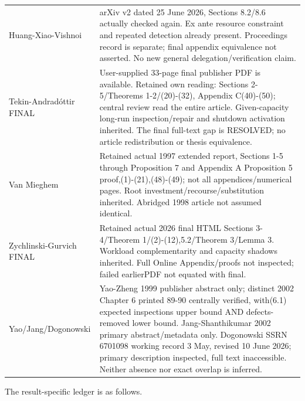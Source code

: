 \documentclass[
  11pt,
  a4paper,
]{article}
\begin{document}
\begin{longtable}[]{@{}
  >{\raggedright\arraybackslash}p{}
  >{\raggedright\arraybackslash}p{}@{}}
Huang-Xiao-Vishnoi & arXiv v2 dated 25 June 2026, Sections 8.2/8.6
actually checked again. Ex ante resource constraint and repeated
detection already present. Proceedings record is separate; final
appendix equivalence not asserted. No new general
delegation/verification claim. \\
Tekin-Andradóttir FINAL & User-supplied 33-page final publisher PDF is
available. Retained own reading: Sections 2-5/Theorems 1-2/(20)-(32),
Appendix C(40)-(50); central review read the entire article.
Given-capacity long-run inspection/repair and shutdown activation
inherited. The final full-text gap is RESOLVED; no article
redistribution or thesis equivalence. \\
Van Mieghem & Retained actual 1997 extended report, Sections 1-5 through
Proposition 7 and Appendix A Proposition 5 proof,(1)-(21),(48)-(49); not
all appendices/numerical pages. Root investment/recourse/substitution
inherited. Abridged 1998 article not assumed identical. \\
Zychlinski-Gurvich FINAL & Retained actual 2026 final HTML Sections
3-4/Theorem 1/(2)-(12),5.2/Theorem 3/Lemma 3. Workload complementarity
and capacity shadows inherited. Full Online Appendix/proofs not
inspected; failed earlierPDF not equated with final. \\
Yao/Jang/Dogonowski & Yao-Zheng 1999 publisher abstract only; distinct
2002 Chapter 6 printed 89-90 centrally verified, with(6.1) expected
inspections upper bound AND defects-removed lower bound.
Jang-Shanthikumar 2002 primary abstract/metadata only. Dogonowski SSRN
6701098 working record 3 May, revised 10 June 2026; primary description
inspected, full text inaccessible. Neither absence nor exact overlap is
inferred. \\
\end{longtable}

The result-specific ledger is as follows.
\end{document}
